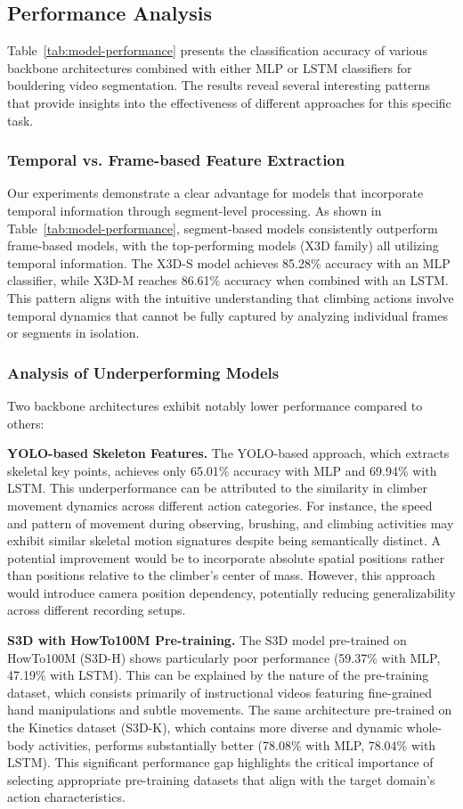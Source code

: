 \subsection{Performance Analysis}
Table~\ref{tab:model-performance} presents the classification accuracy of various backbone architectures combined with either MLP or LSTM classifiers for bouldering video segmentation. The results reveal several interesting patterns that provide insights into the effectiveness of different approaches for this specific task.

\subsubsection{Temporal vs. Frame-based Feature Extraction}
Our experiments demonstrate a clear advantage for models that incorporate temporal information through segment-level processing. As shown in Table~\ref{tab:model-performance}, segment-based models consistently outperform frame-based models, with the top-performing models (X3D family) all utilizing temporal information. The X3D-S model achieves 85.28\% accuracy with an MLP classifier, while X3D-M reaches 86.61\% accuracy when combined with an LSTM. This pattern aligns with the intuitive understanding that climbing actions involve temporal dynamics that cannot be fully captured by analyzing individual frames or segments in isolation.

\subsubsection{Analysis of Underperforming Models}
Two backbone architectures exhibit notably lower performance compared to others:

\noindent\textbf{YOLO-based Skeleton Features.}
The YOLO-based approach, which extracts skeletal key points, achieves only 65.01\% accuracy with MLP and 69.94\% with LSTM. This underperformance can be attributed to the similarity in climber movement dynamics across different action categories. For instance, the speed and pattern of movement during observing, brushing, and climbing activities may exhibit similar skeletal motion signatures despite being semantically distinct. A potential improvement would be to incorporate absolute spatial positions rather than positions relative to the climber's center of mass. However, this approach would introduce camera position dependency, potentially reducing generalizability across different recording setups.

\noindent\textbf{S3D with HowTo100M Pre-training.}
The S3D model pre-trained on HowTo100M (S3D-H) shows particularly poor performance (59.37\% with MLP, 47.19\% with LSTM). This can be explained by the nature of the pre-training dataset, which consists primarily of instructional videos featuring fine-grained hand manipulations and subtle movements. The same architecture pre-trained on the Kinetics dataset (S3D-K), which contains more diverse and dynamic whole-body activities, performs substantially better (78.08\% with MLP, 78.04\% with LSTM). This significant performance gap highlights the critical importance of selecting appropriate pre-training datasets that align with the target domain's action characteristics.

